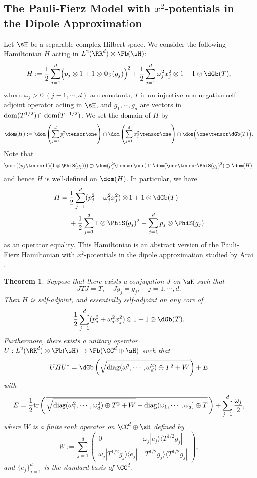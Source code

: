 \documentclass[12pt,draft]{article}
\theoremstyle{plain}
\newtheorem{theorem}{Theorem}[section]
\numberwithin{equation}{section}
\theoremstyle{remark}
\begin{document}
\subsection{The Pauli-Fierz Model with $x^2$-potentials in the Dipole Approximation}\label{PFmodel}
Let $\sH$ be a separable complex Hilbert space.
We consider the following Hamiltonian $H$ acting in $L^2(\RR^d)\otimes\Fb(\sH)$:
\[
H:=\frac{1}{2}\sum_{j=1}^{d}\Bigl(p_j\otimes 1+1\otimes\Phi_{\rm S}(g_j)\Bigr)^2 
+\frac{1}{2}\sum_{j=1}^d \omega_j^2x_j^2\otimes 1 +1\otimes\dGb(T),
\]
where $\omega_j>0\ (j=1,\cdots, d)$ are constants, $T$ is an injective non-negative self-adjoint operator acting in $\sH$,
and $g_1,\cdots,g_d$ are vectors in ${\rm dom}(T^{1/2})\cap{\rm dom}(T^{-1/2})$.
We set the domain of $H$ by
\begin{align}
 \dom(H) 
 := \dom\left(\sum_{j=1}^d p_j^2\tensor\one\right) 
  \cap \dom\left(\sum_{j=1}^d x_j^2\tensor \one\right)
  \cap \dom\Big( \one\tensor \dGb(T)\Big).  \label{dom of Hpf}
\end{align}
Note that
\begin{align*}
  \dom\left((p_j\tensor 1)(1\otimes \PhiS(g_j))\right) \supset \dom(p_j^2\tensor\one)\cap\dom(\one\tensor\PhiS(g_j)^2) \supset \dom(H),
\end{align*}
and hence $H$ is well-defined on $\dom(H)$.
In particular, we have
\begin{align}
H &= \frac{1}{2}\sum_{j=1}^d(p_j^2+\omega_j^2x_j^2)\otimes 1 + 1\otimes\dGb(T)\notag\\
&~~~~+ \frac{1}{2}\sum_{j=1}^d1\otimes\PhiS(g_j)^2 + \sum_{j=1}^dp_j\otimes\PhiS(g_j)\label{gpfh}
\end{align}
as an operator equality.
This Hamiltonian is an abstract version of the Pauli-Fierz Hamiltonian with $x^2$-potentials in the dipole approximation studied by Arai \cite{A83}.

\begin{theorem}
Suppose that there exists a conjugation $J$ on $\sH$ such that 
\[
JTJ=T,\ \ \ \ \ Jg_j=g_j,\ \ \ \ \ j=1,\cdots,d.
\]
Then $H$ is self-adjoint, and essentially self-adjoint on any core of
\[
\frac{1}{2}\sum_{j=1}^d(p_j^2+\omega_j^2x_j^2)\otimes 1 + 1\otimes\dGb(T).
\]
Furthermore, there exists a unitary operator $U:L^2(\RR^d)\otimes\Fb(\sH)\to\Fb(\CC^d\oplus\sH)$ such that 
\[
UHU^*=\dGb\left(\sqrt{{\rm diag}(\omega_1^2,\cdots,\omega_d^2)\oplus T^2 + W}\right)
+E
\]
with
\[
E=\frac{1}{2}\mathrm{tr}\left(\,\overline{\sqrt{{\rm diag}(\omega_1^2,\cdots,\omega_d^2)\oplus T^2 + W}-{\rm diag}(\omega_1,\cdots,\omega_d)\oplus T}\,\right)+\sum_{j=1}^d\frac{\omega_j}{2},
\]
where $W$ is a finite rank operator on $\CC^d\oplus\sH$ defined by
\[
W:=\sum_{j=1}^d
\begin{pmatrix}
0 & \omega_j|e_j\rangle\langle T^{1/2}g_j| \\
\omega_j |T^{1/2}g_j\rangle\langle e_j| &  |T^{1/2}g_j\rangle\langle T^{1/2}g_j|
\end{pmatrix},
\]
and $\{e_j\}_{j=1}^d$ is the standard basis of $\CC^d$.
\end{theorem}
\end{document}
